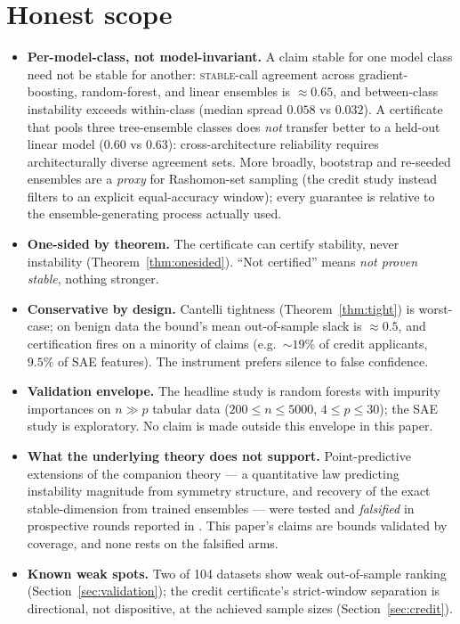 \documentclass[10pt]{article}
\newcommand{\stab}{\textsc{stable}}
\begin{document}
\section{Honest scope}
\label{sec:scope}

\begin{itemize}[leftmargin=1.5em,itemsep=1pt,topsep=2pt]
\item \textbf{Per-model-class, not model-invariant.} A claim stable for one model class
  need not be stable for another: \stab{}-call agreement across gradient-boosting,
  random-forest, and linear ensembles is ${\approx}0.65$, and between-class instability
  exceeds within-class (median spread $0.058$ vs $0.032$). A certificate that pools three
  tree-ensemble classes does \emph{not} transfer better to a held-out linear model
  ($0.60$ vs $0.63$): cross-architecture reliability requires architecturally diverse
  agreement sets. More broadly, bootstrap and re-seeded ensembles are a \emph{proxy}
  for Rashomon-set sampling (the credit study instead filters to an explicit
  equal-accuracy window); every guarantee is relative to the ensemble-generating
  process actually used.
\item \textbf{One-sided by theorem.} The certificate can certify stability, never
  instability (Theorem~\ref{thm:onesided}). ``Not certified'' means \emph{not proven
  stable}, nothing stronger.
\item \textbf{Conservative by design.} Cantelli tightness (Theorem~\ref{thm:tight}) is
  worst-case; on benign data the bound's mean out-of-sample slack is ${\approx}0.5$, and
  certification fires on a minority of claims (e.g.\ ${\sim}19\%$ of credit applicants,
  $9.5\%$ of SAE features). The instrument prefers silence to false confidence.
\item \textbf{Validation envelope.} The headline study is random forests with impurity
  importances on $n\gg p$ tabular data ($200\le n\le5000$, $4\le p\le30$); the SAE study
  is exploratory. No claim is made outside this envelope in this paper.
\item \textbf{What the underlying theory does not support.} Point-predictive extensions
  of the companion theory --- a quantitative law predicting instability magnitude from
  symmetry structure, and recovery of the exact stable-dimension from trained ensembles
  --- were tested and \emph{falsified} in prospective rounds reported in
  \citep{caraker2026limits}. This paper's claims are bounds validated by coverage, and
  none rests on the falsified arms.
\item \textbf{Known weak spots.} Two of 104 datasets show weak out-of-sample ranking
  (Section~\ref{sec:validation}); the credit certificate's strict-window separation is
  directional, not dispositive, at the achieved sample sizes
  (Section~\ref{sec:credit}).
\end{itemize}
\end{document}
